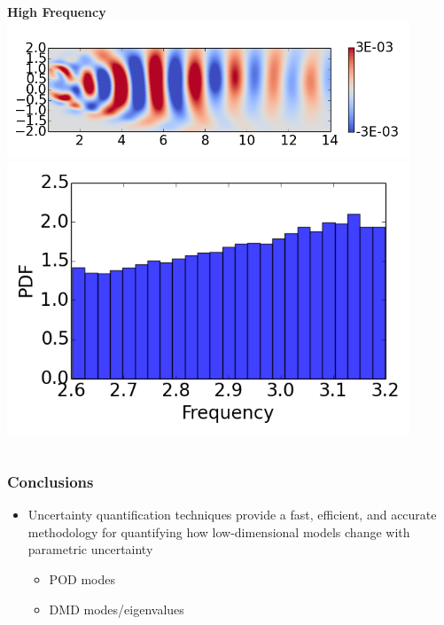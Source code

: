 \documentclass[9pt]{beamer}
\begin{document}
\begin{frame}
\begin{columns}[c]
   \centering
    \textbf{High Frequency} \\
    \includegraphics[width=0.9\textwidth]{DMDMode3} \\
    \includegraphics[width=0.9\textwidth]{PerturbDMDEigFastPDF}
\end{columns}
\end{frame}
\begin{frame}
\frametitle{Conclusions}
\label{sec-3-6}

\begin{itemize}
\item Uncertainty quantification techniques provide a fast, efficient, and
  accurate methodology for quantifying how low-dimensional models
  change with parametric uncertainty
\begin{itemize}
\item POD modes
\item DMD modes/eigenvalues
\end{itemize}
\end{itemize}
\end{frame}
\end{document}
